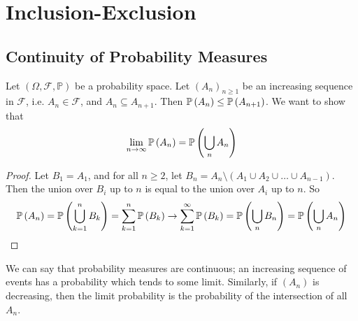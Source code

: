 \documentclass{article}
\begin{document}
\section{Inclusion-Exclusion}
\subsection{Continuity of Probability Measures}
Let $(\Omega, \mathcal F, \mathbb P)$ be a probability space. Let $(A_n)_{n \geq 1}$ be an increasing sequence in $\mathcal F$, i.e. $A_n \in \mathcal F$, and $A_n \subseteq A_{n+1}$. Then $\mathbb{P}\left({A_n}\right) \leq \mathbb{P}\left({A_{n+1}}\right)$. We want to show that
\[ \lim_{n \to \infty}\mathbb{P}\left({A_n}\right) = \mathbb{P}\left({\bigcup_n A_n}\right) \]
\begin{proof}
    Let $B_1 = A_1$, and for all $n \geq 2$, let $B_n = A_n \setminus (A_1 \cup A_2 \cup \dots \cup A_{n-1})$. Then the union over $B_i$ up to $n$ is equal to the union over $A_i$ up to $n$. So
    \[ \mathbb{P}\left({A_n}\right) = \mathbb{P}\left({\bigcup_{k=1}^n B_k}\right) = \sum_{k=1}^n \mathbb{P}\left({B_k}\right) \to \sum_{k=1}^\infty \mathbb{P}\left({B_k}\right) = \mathbb{P}\left({\bigcup_n B_n}\right) = \mathbb{P}\left({\bigcup_n A_n}\right) \]
\end{proof}
\noindent We can say that probability measures are continuous; an increasing sequence of events has a probability which tends to some limit. Similarly, if $(A_n)$ is decreasing, then the limit probability is the probability of the intersection of all $A_n$.
\end{document}
